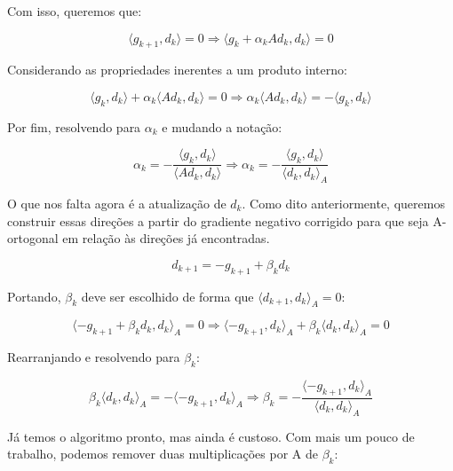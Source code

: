 Com isso, queremos que:

\begin{equation}
\label{def_gc_dk_gk1}
\langle g_{k+1}, d_k \rangle = 0 \Rightarrow \langle g_k + \alpha_k A d_k, d_k \rangle = 0
\end{equation}


Considerando as propriedades inerentes a um produto interno:

\begin{equation}
\langle g_k, d_k \rangle + \alpha_k \langle A d_k, d_k \rangle = 0 \Rightarrow \alpha_k \langle A d_k, d_k \rangle = - \langle g_k, d_k \rangle
\end{equation}

Por fim, resolvendo para \(\alpha_k\) e mudando a notação:

\begin{equation}
\alpha_k= - \frac{\langle g_k, d_k \rangle}{\langle A d_k, d_k \rangle} \Rightarrow \alpha_k= - \frac{\langle g_k, d_k \rangle}{\langle d_k, d_k \rangle_A}
\end{equation}


O que nos falta agora é a atualização de \(d_k\). Como dito anteriormente, queremos
construir essas direções a partir do gradiente negativo corrigido para que seja
A-ortogonal em relação às direções já encontradas.

\begin{equation}
\label{def_dk1}
d_{k+1} = -g_{k+1} + \beta_k d_k
\end{equation}

Portando, \(\beta_k\) deve ser escolhido de forma que \(\langle d_{k+1}, d_k \rangle_A = 0\):

\begin{equation}
\langle -g_{k+1} + \beta_k d_k, d_k \rangle_A = 0 \Rightarrow \langle -g_{k+1}, d_k \rangle_A + \beta_k \langle d_k, d_k \rangle_A = 0
\end{equation}

Rearranjando e resolvendo para \( \beta_k \):

\begin{equation}
  \beta_k \langle d_k, d_k \rangle_A = - \langle -g_{k+1}, d_k \rangle_A \Rightarrow \beta_k = -\frac{\langle -g_{k+1}, d_k \rangle_A}{\langle d_k, d_k \rangle_A}
\end{equation}

Já temos o algoritmo pronto, mas ainda é custoso. Com mais um pouco de trabalho, podemos
remover duas multiplicações por A de \(\beta_k\):

